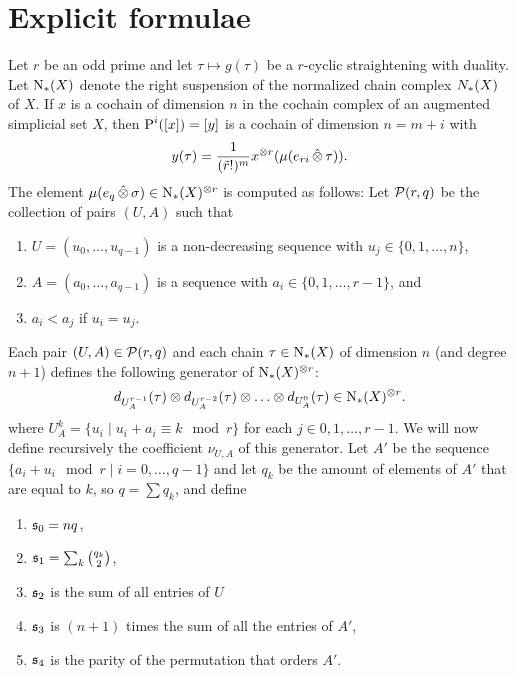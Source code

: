 
\section{Explicit formulae}\label{s:formulas}

Let $r$ be an odd prime and let $\tau\mapsto g(\tau)$ be a $r$-cyclic straightening with duality. Let $\operatorname{N}_{*}(X)$ denote the right suspension of the normalized chain complex $N_{*}(X)$ of $X$. If $x$ is a cochain of dimension $n$ in the cochain complex of an augmented simplicial set $X$, then $\operatorname{P}^i([x]) = [y]$ is a cochain of dimension $n = m+i$ with
\[
	y(\tau) = \frac{1}{(\tilde{r}!)^{m}}x^{\otimes r}(\mu(e_{ri} \operatorname{\hat{\otimes}} \tau)).
\]
The element $\mu(e_{q} \operatorname{\hat{\otimes}} \sigma)\in \operatorname{N}_{*}(X)^{\otimes r}$ is computed as follows: Let $\mathcal{P}(r,q)$ be the collection of pairs $(U,A)$ such that
\renewcommand{\theenumi}{\roman{enumi}}%
\begin{enumerate}
	\item $U = (u_0,\dots,u_{q-1})$ is a non-decreasing sequence with $u_j\in \{0,1,\dots,n\}$,
    \item $A = (a_0,\dots,a_{q-1})$ is a sequence with $a_i\in \{0,1,\dots,r-1\}$, and
	\item\label{condfor:3} $a_i<a_j$ if $u_i=u_j$.
\end{enumerate}
Each pair $(U,A)\in \mathcal{P}(r,q)$ and each chain $\tau\in \operatorname{N}_{*}(X)$ of dimension $n$ (and degree $n+1$) defines the following generator of $\operatorname{N}_{*}(X)^{\otimes r}$:
\[
	d_{U_A^{r-1}}(\tau) \ot d_{U_A^{r-2}}(\tau) \ot \dots \ot d_{U_A^{0}}(\tau)\in \chains(X)^{\ot r}.
\]
where $U_A^k = \{u_i\mid u_i + a_i \equiv k\mod r\}$ for each $j\in 0,1,\dots,r-1$. We will now define recursively the coefficient $\nu_{U,A}$ of this generator. Let $A'$ be the sequence $\{a_i+u_i\mod r\mid i=0,\dots,q-1\}$ and let $q_k$ be the amount of elements of $A'$ that are equal to $k$, so $q=\sum q_k$, and define
\renewcommand{\theenumi}{\arabic{enumi}}
\begin{enumerate}
 \item $\mathfrak{s}_0 = nq$,
	\item $ \mathfrak{s}_1 = \sum_k\binom{q_k}{2}$,
	\item $ \mathfrak{s}_2$ is the sum of all entries of $U$
	\item $ \mathfrak{s}_3$ is $(n+1)$ times the sum of all the entries of $A'$,
	\item $ \mathfrak{s}_4$ is the parity of the permutation that orders $A'$.
\end{enumerate}
